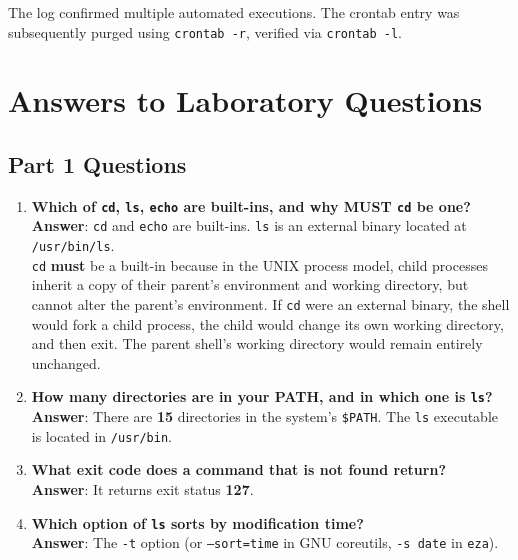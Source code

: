 \documentclass[12pt,a4paper]{article}
\begin{document}
The log confirmed multiple automated executions. The crontab entry was subsequently purged using \texttt{crontab -r}, verified via \texttt{crontab -l}.

\section{Answers to Laboratory Questions}

\subsection{Part 1 Questions}
\begin{enumerate}
    \item \textbf{Which of \texttt{cd}, \texttt{ls}, \texttt{echo} are built-ins, and why MUST \texttt{cd} be one?} \\
    \textbf{Answer}: \texttt{cd} and \texttt{echo} are built-ins. \texttt{ls} is an external binary located at \texttt{/usr/bin/ls}. \\
    \texttt{cd} \textbf{must} be a built-in because in the UNIX process model, child processes inherit a copy of their parent's environment and working directory, but cannot alter the parent's environment. If \texttt{cd} were an external binary, the shell would fork a child process, the child would change its own working directory, and then exit. The parent shell's working directory would remain entirely unchanged.
    
    \item \textbf{How many directories are in your PATH, and in which one is \texttt{ls}?} \\
    \textbf{Answer}: There are \textbf{15} directories in the system's \texttt{\$PATH}. The \texttt{ls} executable is located in \texttt{/usr/bin}.
    
    \item \textbf{What exit code does a command that is not found return?} \\
    \textbf{Answer}: It returns exit status \textbf{127}.
    
    \item \textbf{Which option of \texttt{ls} sorts by modification time?} \\
    \textbf{Answer}: The \texttt{-t} option (or \texttt{--sort=time} in GNU coreutils, \texttt{-s date} in \texttt{eza}).
\end{enumerate}
\end{document}
